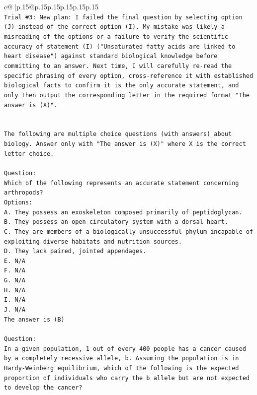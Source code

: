 \documentclass{article}
\begin{document}
{\begin{supertabular}{c@{$\;$}|p{.15\linewidth}@{}p{.15\linewidth}p{.15\linewidth}p{.15\linewidth}p{.15\linewidth}p{.15\linewidth}}
{{{\\ 
\texttt{Trial \#3: New plan: I failed the final question by selecting option (J) instead of the correct option (I). My mistake was likely a misreading of the options or a failure to verify the scientific accuracy of statement (I) ("Unsaturated fatty acids are linked to heart disease") against standard biological knowledge before committing to an answer. Next time, I will carefully re{-}read the specific phrasing of every option, cross{-}reference it with established biological facts to confirm it is the only accurate statement, and only then output the corresponding letter in the required format "The answer is (X)".} \\
\\ 
\\ 
\texttt{The following are multiple choice questions (with answers) about biology. Answer only with "The answer is (X)" where X is the correct letter choice.} \\
\\ 
\texttt{Question:} \\
\texttt{Which of the following represents an accurate statement concerning arthropods?} \\
\texttt{Options:} \\
\texttt{A. They possess an exoskeleton composed primarily of peptidoglycan.} \\
\texttt{B. They possess an open circulatory system with a dorsal heart.} \\
\texttt{C. They are members of a biologically unsuccessful phylum incapable of exploiting diverse habitats and nutrition sources.} \\
\texttt{D. They lack paired, jointed appendages.} \\
\texttt{E. N/A} \\
\texttt{F. N/A} \\
\texttt{G. N/A} \\
\texttt{H. N/A} \\
\texttt{I. N/A} \\
\texttt{J. N/A} \\
\texttt{The answer is (B)} \\
\\ 
\texttt{Question:} \\
\texttt{In a given population, 1 out of every 400 people has a cancer caused by a completely recessive allele, b. Assuming the population is in Hardy{-}Weinberg equilibrium, which of the following is the expected proportion of individuals who carry the b allele but are not expected to develop the cancer?} \\
}}}
\end{supertabular}}
\end{document}
